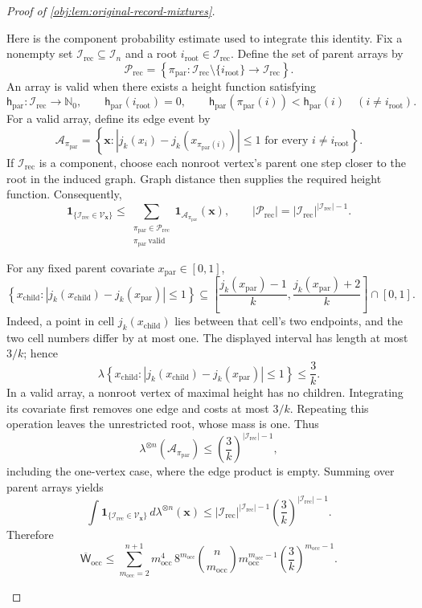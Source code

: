 \documentclass[11pt]{article}
\begin{document}
\begin{proof}[Proof of \cref{obj:lem:original-record-mixtures}]
\begin{enumerate}
Here is the component probability estimate used to integrate this
identity. Fix a nonempty set \(\mathcal I_{\mathrm{rec}}\subseteq\mathcal I_n\)
and a root \(i_{\mathrm{root}}\in\mathcal I_{\mathrm{rec}}\). Define the set
of parent arrays by
\[
\mathscr P_{\mathrm{rec}}
=\left\{
\pi_{\mathrm{par}}:
\mathcal I_{\mathrm{rec}}\setminus\{i_{\mathrm{root}}\}
\longrightarrow\mathcal I_{\mathrm{rec}}
\right\}.
\]
An array is valid when there exists a height function satisfying
\[
\mathsf h_{\mathrm{par}}:\mathcal I_{\mathrm{rec}}\to\mathbb N_0,
\qquad
\mathsf h_{\mathrm{par}}(i_{\mathrm{root}})=0,
\qquad
\mathsf h_{\mathrm{par}}(\pi_{\mathrm{par}}(i))
<\mathsf h_{\mathrm{par}}(i)
\quad(i\ne i_{\mathrm{root}}).
\]
For a valid array, define its edge event by
\[
\mathscr A_{\pi_{\mathrm{par}}}
=
\left\{\mathbf x:
|j_k(x_i)-j_k(x_{\pi_{\mathrm{par}}(i)})|\le1
\text{ for every }i\ne i_{\mathrm{root}}\right\}.
\]
If \(\mathcal I_{\mathrm{rec}}\) is a component, choose each nonroot
vertex's parent one step closer to the root in the induced graph.
Graph distance then supplies the required height function. Consequently,
\[
\mathbf1_{\{\mathcal I_{\mathrm{rec}}\in\mathscr V_{\mathbf x}\}}
\le
\sum_{\substack{\pi_{\mathrm{par}}\in\mathscr P_{\mathrm{rec}}\\
\pi_{\mathrm{par}}\ \mathrm{valid}}}
\mathbf1_{\mathscr A_{\pi_{\mathrm{par}}}}(\mathbf x),
\qquad
|\mathscr P_{\mathrm{rec}}|
=|\mathcal I_{\mathrm{rec}}|^{|\mathcal I_{\mathrm{rec}}|-1}.
\]

For any fixed parent covariate \(x_{\mathrm{par}}\in[0,1]\),
\[
\left\{x_{\mathrm{child}}:
|j_k(x_{\mathrm{child}})-j_k(x_{\mathrm{par}})|\le1\right\}
\subseteq
\left[
\frac{j_k(x_{\mathrm{par}})-1}{k},
\frac{j_k(x_{\mathrm{par}})+2}{k}
\right]\cap[0,1].
\]
Indeed, a point in cell \(j_k(x_{\mathrm{child}})\) lies between that
cell's two endpoints, and the two cell numbers differ by at most one.
The displayed interval has length at most \(3/k\); hence
\[
\lambda\left\{x_{\mathrm{child}}:
|j_k(x_{\mathrm{child}})-j_k(x_{\mathrm{par}})|\le1\right\}
\le\frac3k.
\]
In a valid array, a nonroot vertex of maximal height has no children.
Integrating its covariate first removes one edge and costs at most
\(3/k\). Repeating this operation leaves the unrestricted root, whose
mass is one. Thus
\[
\lambda^{\otimes n}(\mathscr A_{\pi_{\mathrm{par}}})
\le
\left(\frac3k\right)^{|\mathcal I_{\mathrm{rec}}|-1},
\]
including the one-vertex case, where the edge product is empty. Summing
over parent arrays yields
\[
\int
\mathbf1_{\{\mathcal I_{\mathrm{rec}}\in\mathscr V_{\mathbf x}\}}\,
d\lambda^{\otimes n}(\mathbf x)
\le
|\mathcal I_{\mathrm{rec}}|^{|\mathcal I_{\mathrm{rec}}|-1}
\left(\frac3k\right)^{|\mathcal I_{\mathrm{rec}}|-1}.
\]
Therefore
\[
\overline{\mathsf W}_{\mathrm{occ}}
\le
\sum_{m_{\mathrm{occ}}=2}^{n+1}
m_{\mathrm{occ}}^4\,8^{m_{\mathrm{occ}}}
\binom n{m_{\mathrm{occ}}}
m_{\mathrm{occ}}^{m_{\mathrm{occ}}-1}
\left(\frac3k\right)^{m_{\mathrm{occ}}-1}.
\]


\end{enumerate}
\end{proof}
\end{document}
